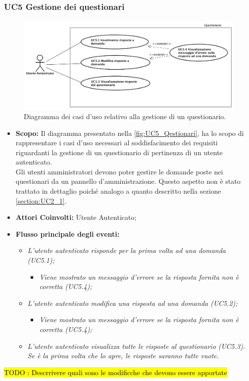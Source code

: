 	\subsubsection{UC5 Gestione dei questionari}
		\label{section:UC5}	
			\begin{figure}[H]
				\begin{center}
					\includegraphics[width=15cm]{Pics/UC5QuestionarioUtenteAutenticato.png}
					\caption{Diagramma dei casi d'uso relativo alla gestione di un questionario.}
					\label{fig:UC5_Qestionari}
				\end{center}
			\end{figure}
			
			\begin{itemize}
				\item \textbf{Scopo:} Il diagramma presentato nella \autoref{fig:UC5_Qestionari}, ha lo scopo di rappresentare i casi d'uso necessari al soddisfacimento dei requisiti riguardanti la gestione di un questionario di pertinenza di un utente autenticato. \\ 
				Gli utenti amministratori devono poter gestire le domande poste nei questionari da un pannello d'amministrazione. Questo aspetto non è stato trattato in dettaglio poiché analogo a quanto descritto nella sezione \ref{section:UC2_1}.
				\item \textbf{Attori Coinvolti:} Utente Autenticato;
				\item \textbf{Flusso principale degli eventi:} 
				\begin{itemize}
					\item \textit{L'utente autenticato risponde per la prima volta ad una domanda (UC5.1);}
					\begin{itemize}
						\item \textit{Viene mostrato un messaggio d'errore se la risposta fornita non è corretta (UC5.4);}
					\end{itemize}
					\item \textit{L'utente autenticato modifica una risposta ad una domanda (UC5.2);}
					\begin{itemize}
						\item \textit{Viene mostrato un messaggio d'errore se la risposta fornita non è corretta (UC5.4);}
					\end{itemize}
					\item \textit{L'utente autenticato visualizza tutte le risposte al questionario (UC5.3). Se è la prima volta che lo apre, le risposte saranno tutte vuote.}
				\end{itemize}
			\end{itemize}
		\hl{TODO : Descrrivere quali sono le modificche che devono essere apportate}
	\newpage		

